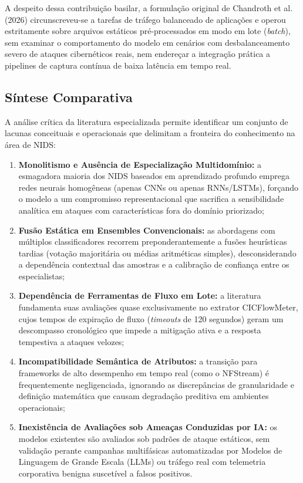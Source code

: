 A despeito dessa contribuição basilar, a formulação original de Chandroth et al. (2026) circunscreveu-se a tarefas de tráfego balanceado de aplicações e operou estritamente sobre arquivos estáticos pré-processados em modo em lote (\emph{batch}), sem examinar o comportamento do modelo em cenários com desbalanceamento severo de ataques cibernéticos reais, nem endereçar a integração prática a pipelines de captura contínua de baixa latência em tempo real.

\subsection{Síntese Comparativa}
\label{subsec:sintese_comparativa}

A análise crítica da literatura especializada permite identificar um conjunto de lacunas conceituais e operacionais que delimitam a fronteira do conhecimento na área de NIDS:

\begin{enumerate}
    \item \textbf{Monolitismo e Ausência de Especialização Multidomínio:} a esmagadora maioria dos NIDS baseados em aprendizado profundo emprega redes neurais homogêneas (apenas CNNs ou apenas RNNs/LSTMs), forçando o modelo a um compromisso representacional que sacrifica a sensibilidade analítica em ataques com características fora do domínio priorizado;
    \item \textbf{Fusão Estática em Ensembles Convencionais:} as abordagens com múltiplos classificadores recorrem preponderantemente a fusões heurísticas tardias (votação majoritária ou médias aritméticas simples), desconsiderando a dependência contextual das amostras e a calibração de confiança entre os especialistas;
    \item \textbf{Dependência de Ferramentas de Fluxo em Lote:} a literatura fundamenta suas avaliações quase exclusivamente no extrator CICFlowMeter, cujos tempos de expiração de fluxo (\emph{timeouts} de 120 segundos) geram um descompasso cronológico que impede a mitigação ativa e a resposta tempestiva a ataques velozes;
    \item \textbf{Incompatibilidade Semântica de Atributos:} a transição para frameworks de alto desempenho em tempo real (como o NFStream) é frequentemente negligenciada, ignorando as discrepâncias de granularidade e definição matemática que causam degradação preditiva em ambientes operacionais;
    \item \textbf{Inexistência de Avaliações sob Ameaças Conduzidas por IA:} os modelos existentes são avaliados sob padrões de ataque estáticos, sem validação perante campanhas multifásicas automatizadas por Modelos de Linguagem de Grande Escala (LLMs) ou tráfego real com telemetria corporativa benigna suscetível a falsos positivos.
\end{enumerate}

